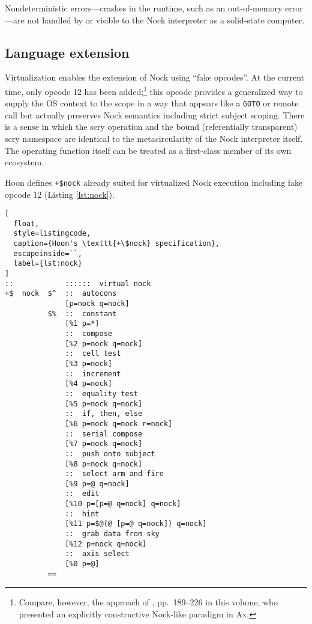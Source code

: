 \documentclass[twoside]{article}
\begin{document}
Nondeterministic errors—crashes in the runtime, such as an out-of-memory error—are not handled by or visible to the Nock interpreter as a solid-state computer.



\subsection{Language extension}

Virtualization enables the extension of Nock using ``fake opcodes''.  At the current time, only opcode 12 has been added;\footnote{Compare, however, the approach of , pp.~189–226 in this volume, who presented an explicitly constructive Nock-like paradigm in Ax.} this opcode provides a generalized way to supply the OS context to the scope in a way that appears like a \texttt{GOTO} or remote call but actually preserves Nock semantics including strict subject scoping.  There is a sense in which the scry operation and the bound (referentially transparent) scry namespace are identical to the metacircularity of the Nock interpreter itself.  The operating function itself can be treated as a first-class member of its own ecosystem.

Hoon defines \lstinline[style=inlinecode]{+$nock} already suited for virtualized Nock execution including fake opcode 12 (Listing \ref{lst:nock}).

\begin{lstlisting}[
  float,
  style=listingcode,
  caption={Hoon's \texttt{+\$nock} specification},
  escapeinside=``,
  label={lst:nock}
]
::            ::::::  virtual nock
+$  nock  $^  ::  autocons
              [p=nock q=nock]
          $%  ::  constant
              [%1 p=*]
              ::  compose
              [%2 p=nock q=nock]
              ::  cell test
              [%3 p=nock]
              ::  increment
              [%4 p=nock]
              ::  equality test
              [%5 p=nock q=nock]
              ::  if, then, else
              [%6 p=nock q=nock r=nock]
              ::  serial compose
              [%7 p=nock q=nock]
              ::  push onto subject
              [%8 p=nock q=nock]
              ::  select arm and fire
              [%9 p=@ q=nock]
              ::  edit
              [%10 p=[p=@ q=nock] q=nock]
              ::  hint
              [%11 p=$@(@ [p=@ q=nock]) q=nock]
              ::  grab data from sky
              [%12 p=nock q=nock]
              ::  axis select
              [%0 p=@]
          ==
\end{lstlisting}
\end{document}
